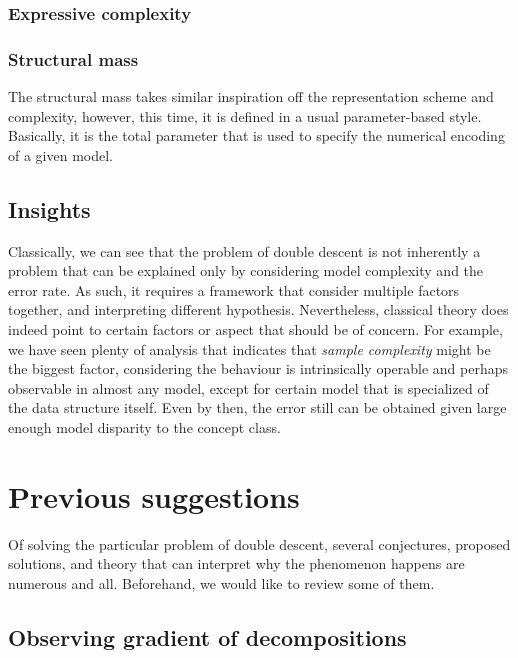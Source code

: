 \subsubsection{Expressive complexity}

\subsubsection{Structural mass}

The structural mass takes similar inspiration off the representation scheme and complexity, however, this time, it is defined in a usual parameter-based style. Basically, it is the total parameter that is used to specify the numerical encoding of a given model. 

\subsection{Insights}

Classically, we can see that the problem of double descent is not inherently a problem that can be explained only by considering model complexity and the error rate. As such, it requires a framework that consider multiple factors together, and interpreting different hypothesis. Nevertheless, classical theory does indeed point to certain factors or aspect that should be of concern. For example, we have seen plenty of analysis that indicates that \textit{sample complexity} might be the biggest factor, considering the behaviour is intrinsically operable and perhaps observable in almost any model, except for certain model that is specialized of the data structure itself. Even by then, the error still can be obtained given large enough model disparity to the concept class.  


\clearpage 

\section{Previous suggestions}

Of solving the particular problem of double descent, several conjectures, proposed solutions, and theory that can interpret why the phenomenon happens are numerous and all. Beforehand, we would like to review some of them. 

\subsection{Observing gradient of decompositions}

